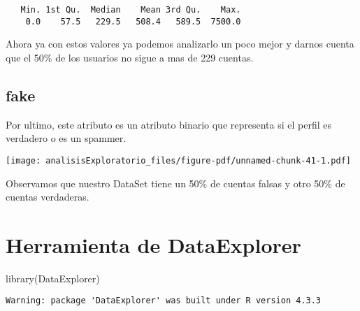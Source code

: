 \documentclass[
  letterpaper,
  DIV=11,
  numbers=noendperiod]{scrreprt}
\newenvironment{Shaded}{\begin{snugshade}}{\end{snugshade}}
\newcommand{\AttributeTok}[1]{\textcolor[rgb]{0.40,0.45,0.13}{#1}}
\newcommand{\DecValTok}[1]{\textcolor[rgb]{0.68,0.00,0.00}{#1}}
\newcommand{\FunctionTok}[1]{\textcolor[rgb]{0.28,0.35,0.67}{#1}}
\newcommand{\NormalTok}[1]{\textcolor[rgb]{0.00,0.23,0.31}{#1}}
\newcommand{\SpecialCharTok}[1]{\textcolor[rgb]{0.37,0.37,0.37}{#1}}
\newcommand{\StringTok}[1]{\textcolor[rgb]{0.13,0.47,0.30}{#1}}
\begin{document}
\begin{Shaded}
\end{Shaded}

\begin{verbatim}
   Min. 1st Qu.  Median    Mean 3rd Qu.    Max. 
    0.0    57.5   229.5   508.4   589.5  7500.0 
\end{verbatim}

Ahora ya con estos valores ya podemos analizarlo un poco mejor y darnos
cuenta que el 50\% de los usuarios no sigue a mas de 229 cuentas.

\subsection{fake}\label{fake}

Por ultimo, este atributo es un atributo binario que representa si el
perfil es verdadero o es un spammer.

\begin{Shaded}
\end{Shaded}

\texttt{[image: analisisExploratorio\_files/figure-pdf/unnamed-chunk-41-1.pdf]}

Observamos que nuestro DataSet tiene un 50\% de cuentas falsas y otro
50\% de cuentas verdaderas.

\section{Herramienta de DataExplorer}\label{herramienta-de-dataexplorer}

\begin{Shaded}
\begin{Highlighting}[]
\FunctionTok{library}\NormalTok{(DataExplorer)}
\end{Highlighting}
\end{Shaded}

\begin{verbatim}
Warning: package 'DataExplorer' was built under R version 4.3.3
\end{verbatim}
\end{document}
